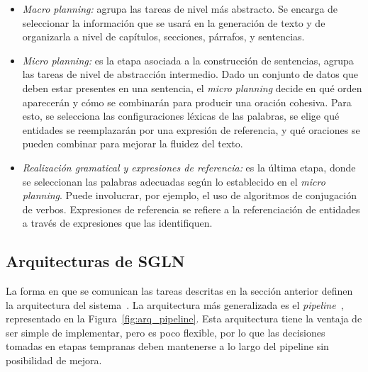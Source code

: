 \begin{itemize}
    \item  \emph{Macro planning:} agrupa las tareas de nivel más abstracto. Se encarga de seleccionar la información que se usará en la generación de texto y de organizarla a nivel de capítulos, secciones, párrafos, y sentencias.
    \item \emph{Micro planning:} es la etapa asociada a la construcción de sentencias, agrupa las tareas de nivel de abstracción intermedio. Dado un conjunto de datos que deben estar presentes en una sentencia, el \emph{micro planning} decide en qué orden aparecerán y cómo se combinarán para producir una oración cohesiva. 
    Para esto, se selecciona las configuraciones léxicas de las palabras, se elige qué entidades se reemplazarán por una expresión de referencia, y qué oraciones se pueden combinar para mejorar la fluidez del texto.
    \item \emph{Realización gramatical y expresiones de referencia:} es la última etapa, donde se seleccionan las palabras adecuadas según lo establecido en el \emph{micro planning}. Puede involucrar, por ejemplo, el uso de algoritmos de conjugación de verbos. Expresiones de referencia se refiere a la referenciación de entidades a través de expresiones que las identifiquen.
\end{itemize}

\subsection{Arquitecturas de SGLN}
La forma en que se comunican las tareas descritas en la sección anterior definen la arquitectura del sistema~\cite{ibanez2004arquitectura}. La arquitectura más generalizada es el \emph{pipeline}~\cite{hervas2008descripcion}, representado en la Figura~\ref{fig:arq_pipeline}.
Esta arquitectura tiene la ventaja de ser simple de implementar, pero es poco flexible, por lo que las decisiones tomadas en etapas tempranas deben mantenerse a lo largo del pipeline sin posibilidad de mejora.

